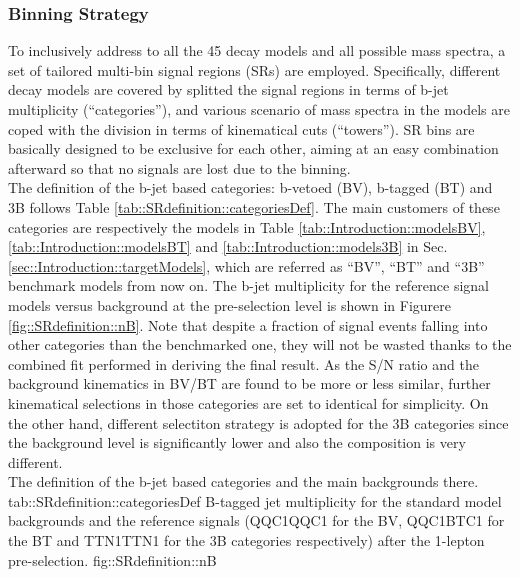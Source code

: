 \subsubsection{Binning Strategy}
To inclusively address to all the 45 decay models and all possible mass spectra, a set of tailored multi-bin signal regions (SRs) are employed.
Specifically, different decay models are covered by splitted the signal regions in terms of b-jet multiplicity (``categories''), 
and various scenario of mass spectra in the models are coped with the division in terms of kinematical cuts (``towers''). 
SR bins are basically designed to be exclusive for each other, aiming at an easy combination afterward so that no signals are lost due to the binning. \\

The definition of the b-jet based categories: b-vetoed (BV), b-tagged (BT) and 3B follows Table \ref{tab::SRdefinition::categoriesDef}. The main customers of these categories are respectively the models in Table \ref{tab::Introduction::modelsBV}, \ref{tab::Introduction::modelsBT} and \ref{tab::Introduction::models3B} in Sec. \ref{sec::Introduction::targetModels}, which are referred as ``BV'', ``BT'' and ``3B'' benchmark models from now on. 
The b-jet multiplicity for the reference signal models versus background at the pre-selection level is shown in Figurere \ref{fig::SRdefinition::nB}.
Note that despite a fraction of signal events falling into other categories than the benchmarked one, they will not be wasted thanks to the combined fit performed in deriving the final result.
As the S/N ratio and the background kinematics in BV/BT are found to be more or less similar, further kinematical selections in those categories are set to identical for simplicity. 
On the other hand, different selectiton strategy is adopted for the 3B categories since the background level is significantly lower and also the composition is very different. \\

{The definition of the b-jet based categories and the main backgrounds there.}
{tab::SRdefinition::categoriesDef}
{B-tagged jet multiplicity for the standard model backgrounds and the reference signals (QQC1QQC1 for the BV, QQC1BTC1 for the BT and TTN1TTN1 for the 3B categories respectively) after the 1-lepton pre-selection.}
{fig::SRdefinition::nB}

